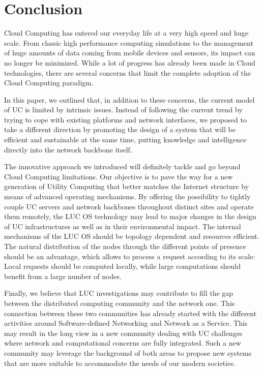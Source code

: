 \section{Conclusion \label{sec:conclusion}}


Cloud Computing has entered our everyday life at a very high speed and huge
scale. From classic high performance computing simulations to the management of
huge amounts of data coming from mobile devices and sensors, its impact can no
longer be minimized. While a lot of progress has already been made in Cloud
technologies, there are several concerns that limit the complete adoption of
the Cloud Computing paradigm. %

In this paper, we outlined that, in addition to these concerns, the current model
of UC is limited by intrinsic issues.  Instead of following the current trend by trying to
cope with existing platforms and network interfaces, we proposed to take a
different direction by promoting the design of a system that will be efficient and sustainable at the same time, putting knowledge and intelligence
directly into the network backbone itself.

The innovative approach we introduced will definitely tackle and go beyond
Cloud Computing limitations. Our objective is to pave the way for a new
generation of Utility Computing that better matches the Internet structure
by means of advanced operating mechanisms.  By offering the possibility to
tightly couple UC servers and network backbones throughout distinct sites and
operate them remotely, the LUC OS technology may lead to major changes in the
design of UC infrastructures as well as in their environmental impact.  The
internal mechanisms of the LUC OS should be topology dependent and resources
efficient. The natural distribution of the nodes through the different points
of presence should be an advantage, which allows to process a request according
to its scale: Local requests should be computed locally, while large computations
should benefit from a large number of nodes.

Finally, we believe that LUC investigations may contribute to fill the gap
between the distributed computing community and the network one. This
connection between these two communities has already started with the different
activities around Software-defined Networking and Network as a Service. This may
result in the long view in a new community dealing with UC challenges where
network and computational concerns are fully integrated. Such a new community
may leverage the background of both areas to propose new systems that are more
suitable to accommodate the needs of our modern societies.

